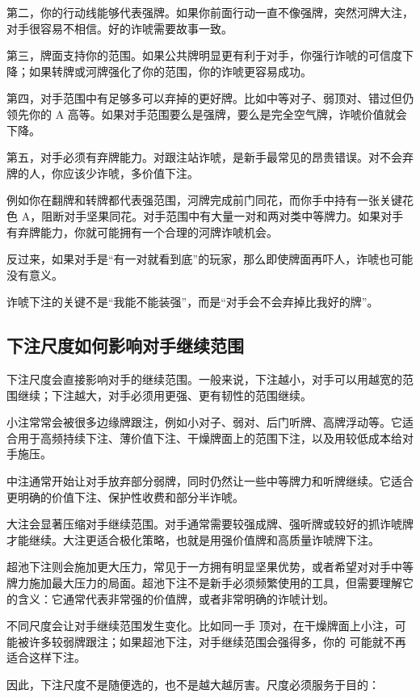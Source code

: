 第二，你的行动线能够代表强牌。如果你前面行动一直不像强牌，突然河牌大注，对手很容易不相信。好的诈唬需要故事一致。

第三，牌面支持你的范围。如果公共牌明显更有利于对手，你强行诈唬的可信度下降；如果转牌或河牌强化了你的范围，你的诈唬更容易成功。

第四，对手范围中有足够多可以弃掉的更好牌。比如中等对子、弱顶对、错过但仍领先你的 A 高等。如果对手范围要么是强牌，要么是完全空气牌，诈唬价值就会下降。

第五，对手必须有弃牌能力。对跟注站诈唬，是新手最常见的昂贵错误。对不会弃牌的人，你应该少诈唬，多价值下注。

例如你在翻牌和转牌都代表强范围，河牌完成前门同花，而你手中持有一张关键花色 A，阻断对手坚果同花。对手范围中有大量一对和两对类中等牌力。如果对手有弃牌能力，你就可能拥有一个合理的河牌诈唬机会。

反过来，如果对手是“有一对就看到底”的玩家，那么即使牌面再吓人，诈唬也可能没有意义。

诈唬下注的关键不是“我能不能装强”，而是“对手会不会弃掉比我好的牌”。

\subsection{下注尺度如何影响对手继续范围}

下注尺度会直接影响对手的继续范围。一般来说，下注越小，对手可以用越宽的范围继续；下注越大，对手必须用更强、更有韧性的范围继续。

小注常常会被很多边缘牌跟注，例如小对子、弱对、后门听牌、高牌浮动等。它适合用于高频持续下注、薄价值下注、干燥牌面上的范围下注，以及用较低成本给对手施压。

中注通常开始让对手放弃部分弱牌，同时仍然让一些中等牌力和听牌继续。它适合更明确的价值下注、保护性收费和部分半诈唬。

大注会显著压缩对手继续范围。对手通常需要较强成牌、强听牌或较好的抓诈唬牌才能继续。大注更适合极化策略，也就是用强价值牌和高质量诈唬牌下注。

超池下注则会施加更大压力，常见于一方拥有明显坚果优势，或者希望对对手中等牌力施加最大压力的局面。超池下注不是新手必须频繁使用的工具，但需要理解它的含义：它通常代表非常强的价值牌，或者非常明确的诈唬计划。

不同尺度会让对手继续范围发生变化。比如同一手  顶对，在干燥牌面上小注，可能被许多较弱牌跟注；如果超池下注，对手继续范围会强得多，你的  可能就不再适合这样下注。

因此，下注尺度不是随便选的，也不是越大越厉害。尺度必须服务于目的：

